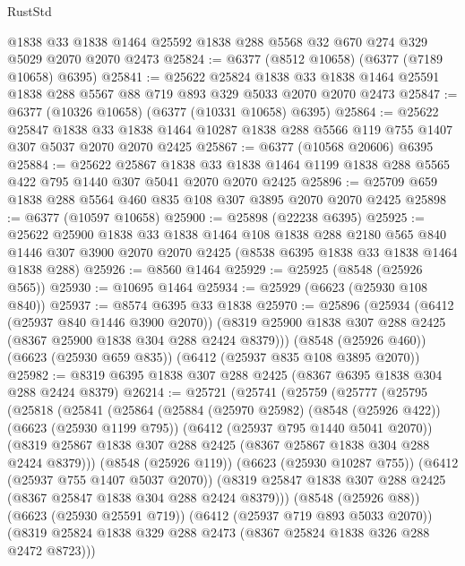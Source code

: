 \begin{lexlean}{RustStd}
\begin{coremodule}
    @1838
    @33
    @1838
    @1464
    @25592
    @1838
    @288
    @5568
    @32
    @670
    @274
    @329
    @5029
    @2070
    @2070
    @2473
@25824 := @6377 (@8512 @10658) (@6377 (@7189 @10658) @6395)
@25841 := @25622
    @25824
    @1838
    @33
    @1838
    @1464
    @25591
    @1838
    @288
    @5567
    @88
    @719
    @893
    @329
    @5033
    @2070
    @2070
    @2473
@25847 := @6377 (@10326 @10658) (@6377 (@10331 @10658) @6395)
@25864 := @25622
    @25847
    @1838
    @33
    @1838
    @1464
    @10287
    @1838
    @288
    @5566
    @119
    @755
    @1407
    @307
    @5037
    @2070
    @2070
    @2425
@25867 := @6377 (@10568 @20606) @6395
@25884 := @25622
    @25867
    @1838
    @33
    @1838
    @1464
    @1199
    @1838
    @288
    @5565
    @422
    @795
    @1440
    @307
    @5041
    @2070
    @2070
    @2425
@25896 := @25709 @659 @1838 @288 @5564 @460 @835 @108 @307 @3895 @2070 @2070 @2425
@25898 := @6377 (@10597 @10658)
@25900 := @25898 (@22238 @6395)
@25925 := @25622
    @25900
    @1838
    @33
    @1838
    @1464
    @108
    @1838
    @288
    @2180
    @565
    @840
    @1446
    @307
    @3900
    @2070
    @2070
    @2425
    (@8538 @6395 @1838 @33 @1838 @1464 @1838 @288)
@25926 := @8560 @1464
@25929 := @25925 (@8548 (@25926 @565))
@25930 := @10695 @1464
@25934 := @25929 (@6623 (@25930 @108 @840))
@25937 := @8574 @6395 @33 @1838
@25970 := @25896
    (@25934
      (@6412 (@25937 @840 @1446 @3900 @2070))
      (@8319 @25900 @1838 @307 @288 @2425 (@8367 @25900 @1838 @304 @288 @2424 @8379)))
    (@8548 (@25926 @460))
    (@6623 (@25930 @659 @835))
    (@6412 (@25937 @835 @108 @3895 @2070))
@25982 := @8319 @6395 @1838 @307 @288 @2425 (@8367 @6395 @1838 @304 @288 @2424 @8379)
@26214 := @25721
    (@25741
      (@25759
        (@25777
          (@25795
            (@25818
              (@25841
                (@25864
                  (@25884
                    (@25970 @25982)
                    (@8548 (@25926 @422))
                    (@6623 (@25930 @1199 @795))
                    (@6412 (@25937 @795 @1440 @5041 @2070))
                    (@8319 @25867 @1838 @307 @288 @2425 (@8367 @25867 @1838 @304 @288 @2424 @8379)))
                  (@8548 (@25926 @119))
                  (@6623 (@25930 @10287 @755))
                  (@6412 (@25937 @755 @1407 @5037 @2070))
                  (@8319 @25847 @1838 @307 @288 @2425 (@8367 @25847 @1838 @304 @288 @2424 @8379)))
                (@8548 (@25926 @88))
                (@6623 (@25930 @25591 @719))
                (@6412 (@25937 @719 @893 @5033 @2070))
                (@8319 @25824 @1838 @329 @288 @2473 (@8367 @25824 @1838 @326 @288 @2472 @8723)))

\end{coremodule}
\end{lexlean}
